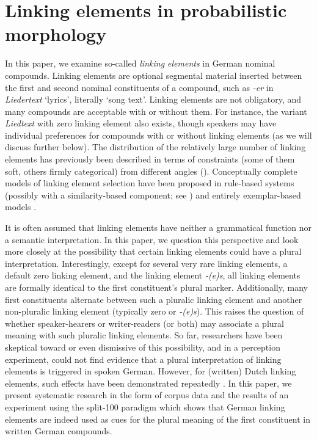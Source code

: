 \section{Linking elements in probabilistic morphology}
\label{sec:linkingelementsinprobabilisticmorphology}

In this paper, we examine so-called \textit{linking elements} in German nominal compounds.
Linking elements are optional segmental material inserted between the first and second nominal constituents of a compound, such as \textit{-er} in \textit{Liedertext} `lyrics', literally `song text'.
Linking elements are not obligatory, and many compounds are acceptable with or without them.
For instance, the variant \textit{Liedtext} with zero linking element also exists, though speakers may have individual preferences for compounds with or without linking elements (as we will discuss further below).
The distribution of the relatively large number of linking elements has previously been described in terms of constraints (some of them soft, others firmly categorical) from different angles (\egg \citealt{Fuhrhop1996,Wegener2003,Schluecker2012,NueblingSzczepaniak2013,FuhrhopKuerschner2015}).
Conceptually complete models of linking element selection have been proposed in rule-based systems (possibly with a similarity-based component; see \citealt{DresslerEa2001}) and entirely exemplar-based models \parencite{KrottEa2007}.

It is often assumed that linking elements have neither a grammatical function nor a semantic interpretation.
In this paper, we question this perspective and look more closely at the possibility that certain linking elements could have a plural interpretation.
Interestingly, except for several very rare linking elements, a default zero linking element, and the linking element \textit{-(e)s}, all linking elements are formally identical to the first constituent's plural marker.
Additionally, many first constituents alternate between such a pluralic linking element and another non-pluralic linking element (typically zero or \textit{-(e)s}).
This raises the question of whether speaker-hearers or writer-readers (or both) may associate a plural meaning with such pluralic linking elements.
So far, researchers have been skeptical toward or even dismissive of this possibility, and in a perception experiment, \textcite{KoesterEa2004} could not find evidence that a plural interpretation of linking elements is triggered in spoken German.
However, for (written) Dutch linking elements, such effects have been demonstrated repeatedly \parencite{SchreuderEa1998,BangaEa2012,BangaEa2013a,BangaEa2013b}.
In this paper, we present systematic research in the form of corpus data and the results of an experiment using the split-100 paradigm which shows that German linking elements are indeed used as cues for the plural meaning of the first constituent in written German compounds.

